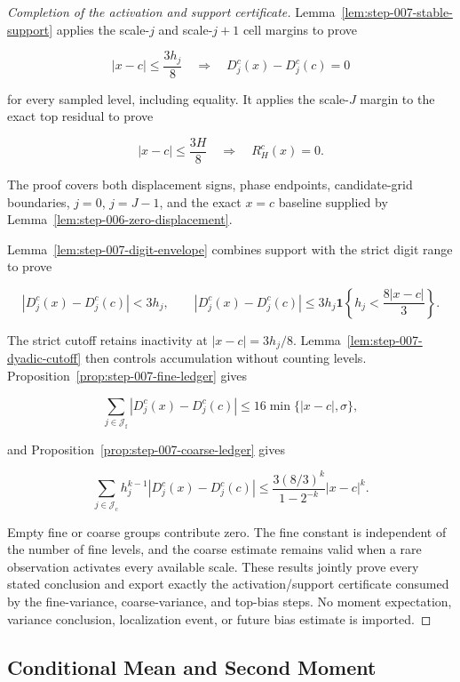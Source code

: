 \begin{proof}[Completion of the activation and support certificate]
Lemma~\ref{lem:step-007-stable-support} applies the scale-\(j\) and scale-\(j+1\) cell margins to prove

\[
|x-c|\leq\frac{3h_j}{8}
\quad\Longrightarrow\quad
D_j^c(x)-D_j^c(c)=0
\]

for every sampled level, including equality. It applies the scale-\(J\) margin to the exact top residual to prove

\[
|x-c|\leq\frac{3H}{8}
\quad\Longrightarrow\quad
R_H^c(x)=0.
\]

The proof covers both displacement signs, phase endpoints, candidate-grid boundaries, \(j=0\), \(j=J-1\), and the exact \(x=c\) baseline supplied by Lemma~\ref{lem:step-006-zero-displacement}.

Lemma~\ref{lem:step-007-digit-envelope} combines support with the strict digit range to prove

\[
\left|D_j^c(x)-D_j^c(c)\right|<3h_j,
\qquad
\left|D_j^c(x)-D_j^c(c)\right|
\leq3h_j\mathbf1\!\left\{h_j<\frac{8|x-c|}{3}\right\}.
\]

The strict cutoff retains inactivity at \(|x-c|=3h_j/8\). Lemma~\ref{lem:step-007-dyadic-cutoff} then controls accumulation without counting levels. Proposition~\ref{prop:step-007-fine-ledger} gives

\[
\sum_{j\in\mathcal J_{\mathrm f}}
\left|D_j^c(x)-D_j^c(c)\right|
\leq16\min\{|x-c|,\sigma\},
\]

and Proposition~\ref{prop:step-007-coarse-ledger} gives

\[
\sum_{j\in\mathcal J_{\mathrm c}}
h_j^{k-1}\left|D_j^c(x)-D_j^c(c)\right|
\leq
\frac{3(8/3)^k}{1-2^{-k}}|x-c|^k.
\]

Empty fine or coarse groups contribute zero. The fine constant is independent of the number of fine levels, and the coarse estimate remains valid when a rare observation activates every available scale. These results jointly prove every stated conclusion and export exactly the activation/support certificate consumed by the fine-variance, coarse-variance, and top-bias steps. No moment expectation, variance conclusion, localization event, or future bias estimate is imported.
\end{proof}

\subsection{Conditional Mean and Second Moment}\label{app:step-008}

